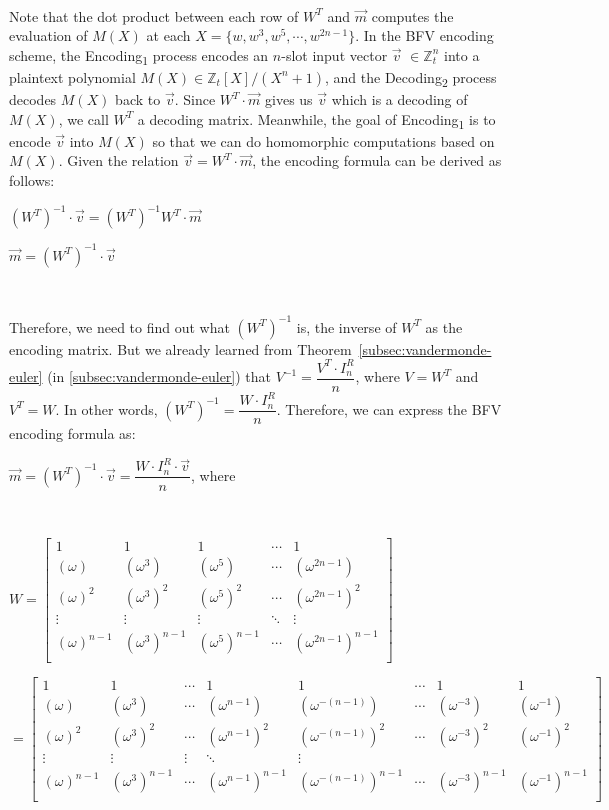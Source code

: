 $ $

Note that the dot product between each row of $W^T$ and $\vec{m}$ computes the evaluation of $M(X)$ at each $X = \{w, w^3, w^5, \cdots, w^{2n-1}\}$. In the BFV encoding scheme, the \textsf{Encoding\textsubscript{1}} process encodes an $n$-slot input vector $\vec{v}$ $\in \mathbb{Z}_t^n$ into a plaintext polynomial $M(X) \in \mathbb{Z}_t[X] / (X^n + 1)$, and the \textsf{Decoding\textsubscript{2}} process decodes $M(X)$ back to $\vec{v}$. Since $W^T \cdot \vec{m}$ gives us $\vec{v}$ which is a decoding of $M(X)$, we call $W^T$ a decoding matrix. Meanwhile, the goal of \textsf{Encoding\textsubscript{1}} is to encode $\vec{v}$ into $M(X)$ so that we can do homomorphic computations based on $M(X)$. Given the relation $\vec{v} = W^T \cdot \vec{m}$, the encoding formula can be derived as follows:

$(W^T)^{-1} \cdot \vec{v} = (W^T)^{-1} W^T \cdot \vec{m}$

$\vec{m} = (W^T)^{-1} \cdot \vec{v}$

$ $

Therefore, we need to find out what $(W^T)^{-1}$ is, the inverse of $W^T$ as the encoding matrix. But we already learned from Theorem~\ref*{subsec:vandermonde-euler} (in \autoref{subsec:vandermonde-euler}) that $V^{-1} = \dfrac{V^T \cdot I_n^R}{n}$, where $V = W^T$ and $V^T = W$. In other words, $(W^T)^{-1} = \dfrac{W \cdot I_n^R}{n}$. Therefore, we can express the BFV encoding formula as: 

$\vec{m} = (W^T)^{-1} \cdot \vec{v} = \dfrac{W \cdot I_n^R \cdot \vec{v}}{n}$, \text{ } where

$ $

$W =  \begin{bmatrix}
1 & 1 & 1 & \cdots & 1\\
(\omega) & (\omega^3) & (\omega^5) & \cdots & (\omega^{2n-1})\\
(\omega)^2 & (\omega^3)^2 & (\omega^5)^2 & \cdots & (\omega^{2n-1})^2\\
\vdots & \vdots & \vdots & \ddots & \vdots \\
(\omega)^{n-1} & (\omega^3)^{n-1} & (\omega^5)^{n-1} & \cdots & (\omega^{2n-1})^{n-1}\\
\end{bmatrix}$

$= \begin{bmatrix}
1 & 1 & \cdots & 1 & 1 & \cdots & 1 & 1\\
(\omega) & (\omega^3) & \cdots & (\omega^{n - 1}) & (\omega^{-(n - 1)}) & \cdots & (\omega^{-3}) & (\omega^{-1})\\
(\omega)^2 & (\omega^3)^2 & \cdots & (\omega^{n - 1})^2 & (\omega^{-(n - 1)})^2 & \cdots & (\omega^{-3})^2 & (\omega^{-1})^2\\
\vdots & \vdots & \vdots & \ddots & \vdots \\
(\omega)^{n-1} & (\omega^3)^{n-1} & \cdots & (\omega^{n - 1})^{n-1} & (\omega^{-(n - 1)})^{n-1} & \cdots & (\omega^{-3})^{n-1} & (\omega^{-1})^{n-1}\\
\end{bmatrix}$

